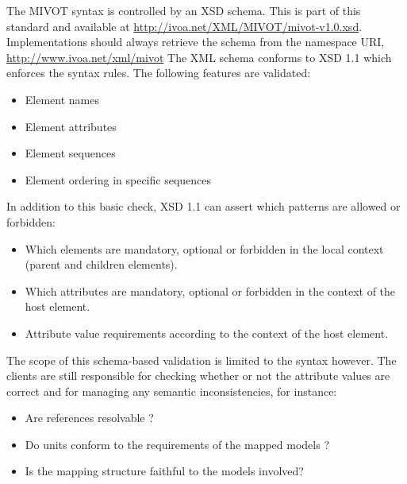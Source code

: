 The MIVOT syntax is controlled by an XSD schema.
This is part of this standard and available at \url{http://ivoa.net/XML/MIVOT/mivot-v1.0.xsd}.
Implementations should always retrieve the schema from the namespace URI, \url{http://www.ivoa.net/xml/mivot}
The XML schema conforms to XSD 1.1 \citep{std:xsd1.1} which enforces the syntax rules. 
The following features are validated:

\begin{itemize} 
  \item Element names 
  \item Element attributes
  \item Element sequences 
  \item Element ordering in specific sequences
\end{itemize}

In addition to this basic check, XSD 1.1 can assert which patterns are allowed or forbidden:

\begin{itemize} 
  \item Which elements are mandatory, optional  or forbidden in the local context (parent and children elements).
  \item Which attributes are mandatory, optional  or forbidden in the context of the host element.
  \item Attribute value requirements according to the context of the host element.

\end{itemize}
 
The scope of this schema-based validation is limited to the syntax however. 
The clients are still responsible for checking whether or not the attribute values are correct and for managing any semantic inconsistencies, for instance:

\begin{itemize} 
  \item Are references resolvable ? 
  \item Do units conform to the requirements of the mapped models ?
  \item Is the mapping structure faithful to the models involved?
\end{itemize}


